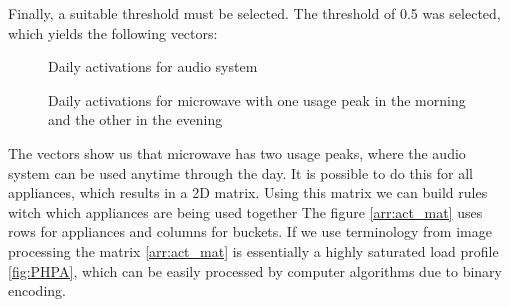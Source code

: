 Finally, a suitable threshold must be selected.
The threshold of 0.5 was selected, which yields the following vectors:

\begin{figure}[H]
    \centering
    \caption{Daily activations for audio system}
    \label{arr:as_acts_vec}
\end{figure}

\begin{figure}[H]
    \centering
    \caption{Daily activations for microwave with one usage peak in the morning and the other in the evening}
    \label{arr:microwave_acts_vec}
\end{figure}

The vectors show us that microwave has two usage peaks, where the audio system can be used anytime through the day.
It is possible to do this for all appliances, which results in a 2D matrix. 
Using this matrix we can build rules witch which appliances are being used together
The figure \ref{arr:act_mat} uses rows for appliances and columns for buckets.  
If we use terminology from image processing the matrix \ref{arr:act_mat} is essentially a highly saturated load profile \ref{fig:PHPA},
which can be easily processed by computer algorithms due to binary encoding. 

